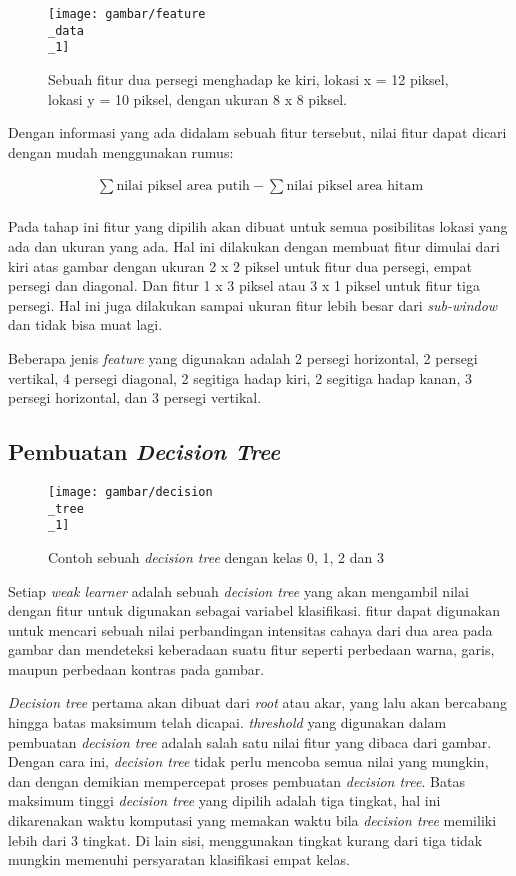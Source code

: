 \begin{figure}[H]
  \centering{}
	\texttt{[image: gambar/feature\\\_data\\\_1]}
  \caption{Sebuah fitur dua persegi menghadap ke kiri, lokasi x = 12 piksel, 
  lokasi y = 10 piksel, dengan ukuran 8 x 8 piksel.}
\end{figure} 
Dengan informasi yang ada didalam sebuah fitur tersebut, nilai fitur dapat dicari dengan 
mudah menggunakan rumus:

\begin{equation}
  \begin{split}
    \sum \text{nilai piksel area putih} -  \sum \text{nilai piksel area hitam} \\ 
  \end{split}
\end{equation}

Pada tahap ini fitur yang dipilih akan dibuat untuk semua 
posibilitas lokasi yang ada dan ukuran yang ada. Hal ini dilakukan dengan 
membuat fitur dimulai dari kiri atas gambar dengan ukuran 2 x 2 piksel untuk fitur 
dua persegi, empat persegi dan diagonal. Dan fitur 1 x 3 piksel atau 3 x 1 piksel untuk 
fitur tiga persegi. Hal ini juga dilakukan sampai ukuran fitur lebih besar 
dari \emph{sub-window} dan tidak bisa muat lagi.

Beberapa jenis \textit{feature} yang digunakan adalah 2 persegi horizontal, 
2 persegi vertikal, 4 persegi diagonal, 2 segitiga hadap kiri, 2 segitiga hadap kanan, 
3 persegi horizontal, dan 3 persegi vertikal.

\subsection{Pembuatan \textit{Decision Tree}}

\begin{figure}[H]
  \centering{}
	\texttt{[image: gambar/decision\\\_tree\\\_1]}
  \caption{Contoh sebuah \textit{decision tree} dengan kelas 0, 1, 2 dan 3}
\end{figure} 

Setiap \emph{weak learner} adalah sebuah \emph{decision tree} yang akan mengambil nilai 
dengan fitur untuk digunakan sebagai variabel klasifikasi.
fitur dapat digunakan untuk mencari 
sebuah nilai perbandingan intensitas cahaya dari dua area pada gambar dan 
mendeteksi keberadaan suatu fitur seperti 
perbedaan warna, garis, maupun perbedaan kontras pada gambar.

\textit{Decision tree} pertama akan dibuat dari \textit{root} atau akar, yang lalu 
akan bercabang hingga batas maksimum telah dicapai. \textit{threshold} yang digunakan 
dalam pembuatan \textit{decision tree} adalah salah satu nilai fitur yang dibaca dari gambar. 
Dengan cara ini, \textit{decision tree} tidak perlu mencoba semua nilai yang mungkin, dan 
dengan demikian mempercepat proses pembuatan \textit{decision tree}.
Batas maksimum tinggi \textit{decision tree }yang dipilih adalah tiga 
tingkat, hal ini dikarenakan waktu komputasi yang memakan waktu bila \textit{decision tree} 
memiliki lebih dari 3 tingkat. Di lain sisi, menggunakan tingkat kurang dari tiga tidak mungkin 
memenuhi persyaratan klasifikasi empat kelas.

